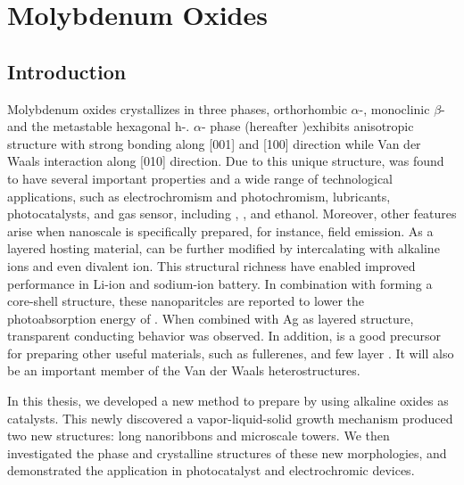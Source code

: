 \chapter{Molybdenum Oxides}

\section{Introduction}

Molybdenum oxides  crystallizes in three phases, orthorhombic $\alpha$-, monoclinic $\beta$- and the metastable hexagonal h-.\citep{Deb1968,Fibers2007} $\alpha$- phase (hereafter )exhibits anisotropic structure with strong bonding along [001] and [100] direction while Van der Waals interaction along [010] direction.\cite{He2003} Due to this unique structure,  was found to have several important properties and a wide range of technological applications, such as electrochromism and photochromism,\cite{Yao1992} lubricants,\cite{Sheehan1996} photocatalysts,\cite{Chen2010} and gas sensor, including ,\cite{Comini2005} ,\cite{Taurino2006} \cite{Sha2009} and ethanol.\cite{Choopun} Moreover, other features arise when nanoscale  is specifically prepared, for instance, field emission.\citep{Li2002d,Zhou2003b}  As a layered hosting material,  can be further modified by intercalating with alkaline ions\citep{Spahr1995,Li2006b,Hu2011} and even divalent ion\cite{Sian2005}. This structural richness have enabled improved performance in Li-ion\cite{Mai2007} and sodium-ion battery.\cite{Hariharan2013} In combination with  forming a core-shell structure, these nanoparitcles are reported to lower the photoabsorption energy of .\cite{Elder2000} When combined with Ag as layered structure, transparent conducting behavior was observed.\cite{Nguyen2012} In addition,  is a good precursor for preparing other useful materials, such as  fullerenes\cite{Li2003c}, and few layer .\cite{Lin2012} It will also be an important member of the Van der Waals heterostructures.\cite{Geim2013}

In this thesis, we developed a new method to prepare  by using alkaline oxides as catalysts. This newly discovered a vapor-liquid-solid growth mechanism produced two new  structures: long nanoribbons and microscale towers. We then investigated the phase and crystalline structures of these new morphologies, and demonstrated the application in photocatalyst and electrochromic devices.


